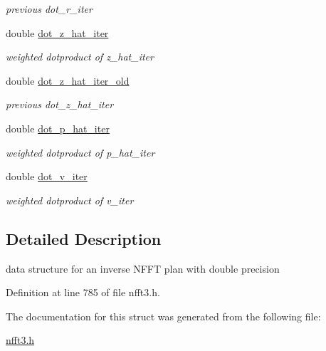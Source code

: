 \begin{DoxyCompactItemize}
\begin{DoxyCompactList}\small\item\em previous dot\-\_\-r\-\_\-iter \end{DoxyCompactList}\item 
\hypertarget{structsolver__plan__double_a495a0f084b43fea59c6328e085467cea}{double \hyperlink{structsolver__plan__double_a495a0f084b43fea59c6328e085467cea}{dot\-\_\-z\-\_\-hat\-\_\-iter}}\label{structsolver__plan__double_a495a0f084b43fea59c6328e085467cea}

\begin{DoxyCompactList}\small\item\em weighted dotproduct of z\-\_\-hat\-\_\-iter \end{DoxyCompactList}\item 
\hypertarget{structsolver__plan__double_a35f2567cc25bcfce28dbb48eba5e49c9}{double \hyperlink{structsolver__plan__double_a35f2567cc25bcfce28dbb48eba5e49c9}{dot\-\_\-z\-\_\-hat\-\_\-iter\-\_\-old}}\label{structsolver__plan__double_a35f2567cc25bcfce28dbb48eba5e49c9}

\begin{DoxyCompactList}\small\item\em previous dot\-\_\-z\-\_\-hat\-\_\-iter \end{DoxyCompactList}\item 
\hypertarget{structsolver__plan__double_a21f781633362300a145e71ea88febbae}{double \hyperlink{structsolver__plan__double_a21f781633362300a145e71ea88febbae}{dot\-\_\-p\-\_\-hat\-\_\-iter}}\label{structsolver__plan__double_a21f781633362300a145e71ea88febbae}

\begin{DoxyCompactList}\small\item\em weighted dotproduct of p\-\_\-hat\-\_\-iter \end{DoxyCompactList}\item 
\hypertarget{structsolver__plan__double_a364a63cb093efa72e618a349a58d1890}{double \hyperlink{structsolver__plan__double_a364a63cb093efa72e618a349a58d1890}{dot\-\_\-v\-\_\-iter}}\label{structsolver__plan__double_a364a63cb093efa72e618a349a58d1890}

\begin{DoxyCompactList}\small\item\em weighted dotproduct of v\-\_\-iter \end{DoxyCompactList}\end{DoxyCompactItemize}


\subsection{Detailed Description}
data structure for an inverse N\-F\-F\-T plan with double precision 

Definition at line 785 of file nfft3.\-h.



The documentation for this struct was generated from the following file\-:\begin{DoxyCompactItemize}
\item 
\hyperlink{nfft3_8h}{nfft3.\-h}\end{DoxyCompactItemize}
